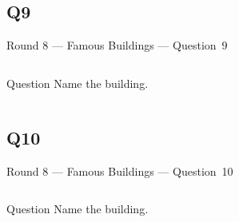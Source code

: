 \documentclass[11pt,draft]{beamer}
\begin{document}
\subsection*{Q9}
\begin{frame}[t]{Round 8 --- Famous Buildings --- \mbox{Question 9}}
    \begin{columns}[T,totalwidth=\linewidth]
        \begin{column}{0.32\linewidth}
            \begin{block}{Question}
                Name the building.
            \end{block}
        \end{column}
        \begin{column}{0.65\linewidth}
            \begin{center}
                \texttt{[image: \{Images/tribune]}.jpg}
            \end{center}
        \end{column}
    \end{columns}
\end{frame}
\subsection*{Q10}
\begin{frame}[t]{Round 8 --- Famous Buildings --- \mbox{Question 10}}
    \begin{columns}[T,totalwidth=\linewidth]
        \begin{column}{0.32\linewidth}
            \begin{block}{Question}
                Name the building.
            \end{block}
        \end{column}
        \begin{column}{0.65\linewidth}
            \begin{center}
                \texttt{[image: \{Images/seagram]}.jpg}
            \end{center}
        \end{column}
    \end{columns}
\end{frame}
\end{document}
